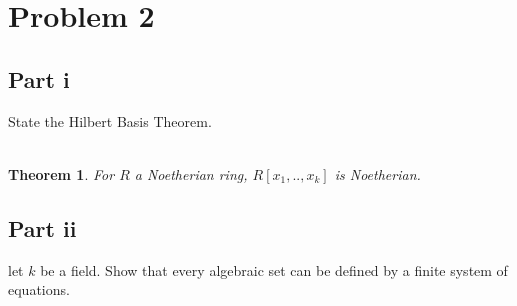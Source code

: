 \documentclass[12pt,reqno]{amsart}
\newtheorem*{theorem}{Theorem}
\begin{document}
\newpage

\section*{Problem 2}
\subsection*{Part i}
State the Hilbert Basis Theorem.
\\
\\
\begin{theorem}
    For $R$ a Noetherian ring, $R[x_1,..,x_k]$ is Noetherian.
\end{theorem}

\subsection*{Part ii}
let $k$ be a field. Show that every algebraic set can be defined by a finite
system of equations.
\\
\\
\end{document}

